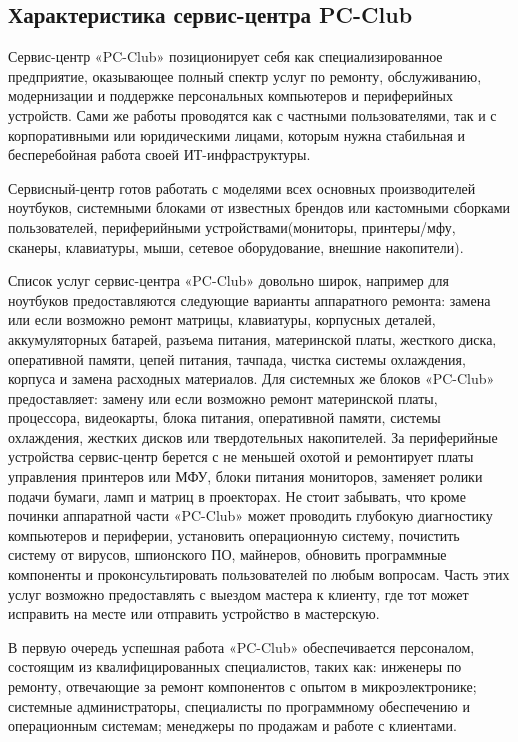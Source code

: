 \subsection{Характеристика сервис-центра PC-Club}

Сервис-центр «PC-Club» позиционирует себя как специализированное предприятие, оказывающее полный спектр услуг по ремонту, обслуживанию, модернизации и поддержке персональных компьютеров и периферийных устройств. Сами же работы проводятся как с частными пользователями, так и с корпоративными или юридическими лицами, которым нужна стабильная и бесперебойная работа своей ИТ-инфраструктуры.

Сервисный-центр готов работать с моделями всех основных производителей ноутбуков, системными блоками от известных брендов или кастомными сборками пользователей, периферийными устройствами(мониторы, принтеры/мфу, сканеры, клавиатуры, мыши, сетевое оборудование, внешние накопители).

Список услуг сервис-центра «PC-Club» довольно широк, например для ноутбуков предоставляются следующие варианты аппаратного ремонта: замена или если возможно ремонт матрицы, клавиатуры, корпусных деталей, аккумуляторных батарей, разъема питания, материнской платы, жесткого диска, оперативной памяти, цепей питания, тачпада, чистка системы охлаждения, корпуса и замена расходных материалов. Для системных же блоков «PC-Club» предоставляет: замену или если возможно ремонт материнской платы, процессора, видеокарты, блока питания, оперативной памяти, системы охлаждения, жестких дисков или твердотельных накопителей. За периферийные устройства сервис-центр берется с не меньшей охотой и ремонтирует платы управления принтеров или МФУ, блоки питания мониторов, заменяет ролики подачи бумаги, ламп и матриц в проекторах. Не стоит забывать, что кроме починки аппаратной части «PC-Club» может проводить глубокую диагностику компьютеров и периферии, установить операционную систему, почистить систему от вирусов, шпионского ПО, майнеров, обновить программные компоненты и проконсультировать пользователей по любым вопросам. Часть этих услуг возможно предоставлять с выездом мастера к клиенту, где тот может исправить на месте или отправить устройство в мастерскую.

В первую очередь успешная работа «PC-Club» обеспечивается персоналом, состоящим из квалифицированных специалистов, таких как: инженеры по ремонту, отвечающие за ремонт компонентов с опытом в микроэлектронике; системные администраторы, специалисты по программному обеспечению и операционным системам; менеджеры по продажам и работе с клиентами.

